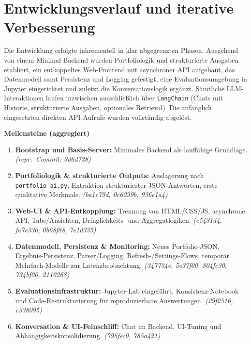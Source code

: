   \section{Entwicklungsverlauf und iterative Verbesserung}

    Die Entwicklung erfolgte inkrementell in klar abgegrenzten Phasen.
    Ausgehend von einem Minimal-Backend wurden Portfoliologik und strukturierte Ausgaben etabliert, ein entkoppeltes Web-Frontend mit asynchroner API aufgebaut, das Datenmodell samt Persistenz und Logging gefestigt, eine Evaluationsumgebung in Jupyter eingerichtet und zuletzt die Konversationslogik ergänzt.
    Sämtliche \acs{LLM}-Interaktionen laufen inzwischen ausschließlich über \texttt{LangChain} (Chats mit Historie, strukturierte Ausgaben, optionales Retrieval).
    Die anfänglich eingesetzten direkten API-Aufrufe wurden vollständig abgelöst.

    \textbf{Meilensteine (aggregiert)}
    \begin{enumerate}
      \item \textbf{Bootstrap und Basis-Server:} Minimales Backend als lauffähige Grundlage. \emph{(repr.\ Commit: 3d6d728)}
      \item \textbf{Portfoliologik \& strukturierte Outputs:} Auslagerung nach \texttt{portfolio\_ai.py}, Extraktion strukturierter \acs{JSON}-Antworten, erste qualitative Merkmale. \emph{(ba1e79d, 0c6299b, 936e1a4)}
      \item \textbf{Web-UI \& API-Entkopplung:} Trennung von HTML/CSS/JS, asynchrone API, Tabs/Ansichten, Dringlichkeits- und Aggregatlogiken. \emph{(c5431d4, fa7e330, 0b68f88, 7e1d335)}
      \item \textbf{Datenmodell, Persistenz \& Monitoring:} Neues Portfolio-\acs{JSON}, Ergebnis-Persistenz, Parser/Logging, Refresh-/Settings-Flows, temporär Mehrfach-Modelle zur Latenzbeobachtung. \emph{(347734e, 5e37f00, 804fc30, 734bf00, 2110268)}
      \item \textbf{Evaluationsinfrastruktur:} Jupyter-Lab eingeführt, Konsistenz-Notebook und Code-Restrukturierung für reproduzierbare Auswertungen. \emph{(29f2516, c338095)}
      \item \textbf{Konversation \& UI-Feinschliff:} Chat im Backend, UI-Tuning und Abhängigkeitskonsolidierung. \emph{(795fec0, 785a421)}
    \end{enumerate}



